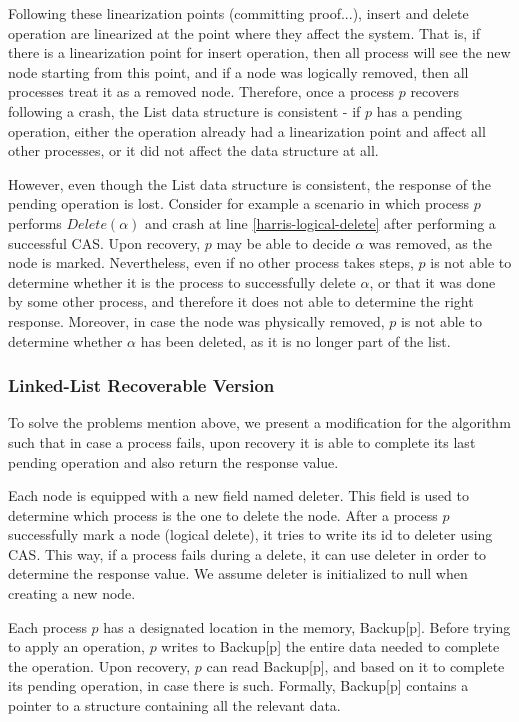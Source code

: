 Following these linearization points (committing proof...), insert and delete operation are linearized at the point where they affect the system. That is, if there is a linearization point for insert operation, then all process will see the new node starting from this point, and if a node was logically removed, then all processes treat it as a removed node. Therefore, once a process $p$ recovers following a crash, the List data structure is consistent - if $p$ has a pending operation, either the operation already had a linearization point and affect all other processes, or it did not affect the data structure at all.

However, even though the List data structure is consistent, the response of the pending operation is lost. Consider for example a scenario in which process $p$ performs $Delete(\alpha)$ and crash at line \ref{harris-logical-delete} after performing a successful CAS. Upon recovery, $p$ may be able to decide $\alpha$ was removed, as the node is marked. Nevertheless, even if no other process takes steps, $p$ is not able to determine whether it is the process to successfully delete $\alpha$, or that it was done by some other process, and therefore it does not able to determine the right response. Moreover, in case the node was physically removed, $p$ is not able to determine whether $\alpha$ has been deleted, as it is no longer part of the list.


\subsubsection{Linked-List Recoverable Version}

To solve the problems mention above, we present a modification for the algorithm such that in case a process fails, upon recovery it is able to complete its last pending operation and also return the response value.

Each node is equipped with a new field named deleter. This field is used to determine which process is the one to delete the node. After a process $p$ successfully mark a node (logical delete), it tries to write its id to deleter using CAS. This way, if a process fails during a delete, it can use deleter in order to determine the response value. We assume deleter is initialized to null when creating a new node.

Each process $p$ has a designated location in the memory, Backup[p]. Before trying to apply an operation, $p$ writes to Backup[p] the entire data needed to complete the operation. Upon recovery, $p$ can read Backup[p], and based on it to complete its pending operation, in case there is such. Formally, Backup[p] contains a pointer to a structure containing all the relevant data.

